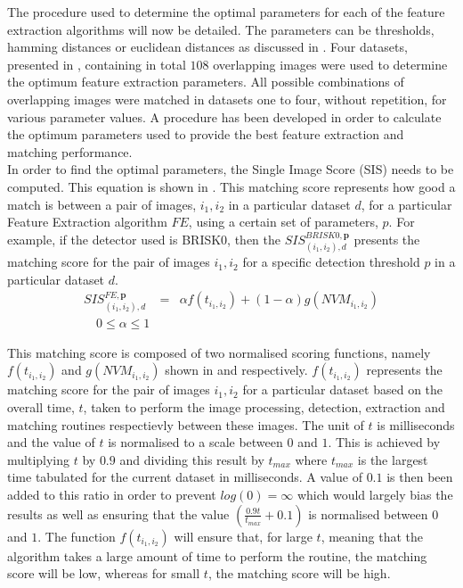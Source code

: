 \documentclass{report}
\begin{document}
The procedure used to determine the optimal parameters for each of the feature extraction algorithms will now be detailed. The parameters can be thresholds, hamming distances or euclidean distances as discussed in . Four datasets, presented in , containing in total $108$ overlapping images were used to determine the optimum feature extraction parameters. All possible combinations of overlapping images were matched in datasets  one to four, without repetition, for various parameter values. A procedure has been developed in order to calculate the optimum parameters used to provide the best feature extraction and matching performance.\\
In order to find the optimal parameters, the Single Image Score (SIS) needs to be computed. This equation is shown in . This matching score represents how good a match is between a pair of images, $i_1, i_2$ in a particular dataset $d$, for a particular Feature Extraction algorithm $FE$, using a certain set of parameters, $p$. For example, if the detector used is BRISK0, then the $SIS_{(i_1, i_2), d}^{BRISK0, \textbf{p}}$ presents the matching score for the pair of images $i_1, i_2$ for a specific detection threshold $p$ in a particular dataset $d$. \\

\begin{eqnarray}
SIS_{(i_1, i_2), d}^{FE, \textbf{p}} &=& \alpha f(t_{i_1,i_2}) + (1-\alpha) g(\textit{NVM}_{i_1,i_2})\\ 
\quad 0 \leq \alpha \leq 1 
\label{eqn:optimalParameters}
\end{eqnarray}

This matching score is composed of two normalised scoring functions, namely $f(t_{i_1, i_2})$ and $g(NVM_{i_1, i_2})$ shown in  and  respectively. $f(t_{i_1, i_2})$ represents the matching score for the pair of images $i_1, i_2$ for a particular dataset based on the overall time, $t$, taken to perform the image processing, detection, extraction and matching routines respectievly between these images. The unit of $t$ is milliseconds and the value of $t$ is normalised to a scale between $0$ and $1$. This is achieved by multiplying $t$ by $0.9$ and dividing this result by $t_{max}$ where $t_{max}$ is the largest time tabulated for the current dataset in milliseconds. A value of $0.1$ is then been added to this ratio in order to  prevent $log(0) = \infty$ which would largely bias the results as well as ensuring that the value $(\frac{0.9 t}{t_{max}} + 0.1)$ is normalised between $0$ and $1$. The function $f(t_{i_1, i_2})$ will ensure that, for large $t$, meaning that the algorithm takes a large amount of time to perform the routine, the matching score will be low, whereas for small $t$, the matching score will be high. \\
\end{document}
